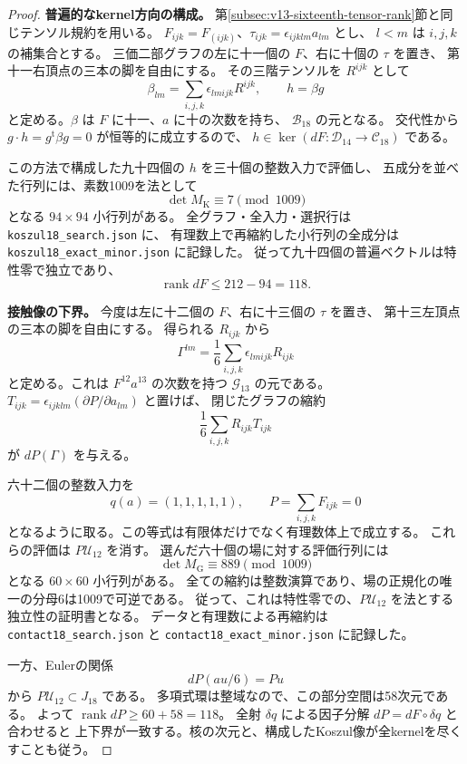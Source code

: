 \documentclass[a4paper,11pt]{ltjsarticle}
\theoremstyle{definition}
\begin{document}
\begin{proof}
\textbf{普遍的なkernel方向の構成。}
第\ref{subsec:v13-sixteenth-tensor-rank}節と同じテンソル規約を用いる。
$F_{ijk}=F_{(ijk)}$、$\tau_{ijk}=\epsilon_{ijklm}a_{lm}$ とし、
$l<m$ は $i,j,k$ の補集合とする。
三価二部グラフの左に十一個の $F$、右に十個の $\tau$ を置き、
第十一右頂点の三本の脚を自由にする。
その三階テンソルを $R^{ijk}$ として
\[
 \beta_{lm}=\sum_{i,j,k}\epsilon_{lmijk}R^{ijk},\qquad h=\beta g
\]
と定める。$\beta$ は $F$ に十一、$a$ に十の次数を持ち、
$\mathcal B_{18}$ の元となる。
交代性から $g\cdot h=g^{\mathrm t}\beta g=0$ が恒等的に成立するので、
$h\in\ker(dF:\mathcal D_{14}\to\mathcal C_{18})$ である。

この方法で構成した九十四個の $h$ を三十個の整数入力で評価し、
五成分を並べた行列には、素数1009を法として
\[
                 \det M_{\mathrm K}\equiv7\pmod{1009}
\]
となる $94\times94$ 小行列がある。
全グラフ・全入力・選択行は
\texttt{koszul18\_search.json} に、
有理数上で再縮約した小行列の全成分は
\texttt{koszul18\_exact\_minor.json} に記録した。
従って九十四個の普遍ベクトルは特性零で独立であり、
\[
                         \operatorname{rank}dF\le212-94=118.
\]

\textbf{接触像の下界。}
今度は左に十二個の $F$、右に十三個の $\tau$ を置き、
第十三左頂点の三本の脚を自由にする。
得られる $R_{ijk}$ から
\[
              \Gamma^{lm}=\frac16\sum_{i,j,k}\epsilon_{lmijk}R_{ijk}
\]
と定める。これは $F^{12}a^{13}$ の次数を持つ
$\mathcal G_{13}$ の元である。
$T_{ijk}=\epsilon_{ijklm}(\partial P/\partial a_{lm})$ と置けば、
閉じたグラフの縮約
\[
                         \frac16\sum_{i,j,k}R_{ijk}T_{ijk}
\]
が $dP(\Gamma)$ を与える。

六十二個の整数入力を
\[
 q(a)=(1,1,1,1,1),\qquad
 P=\sum_{i,j,k}F_{ijk}=0
\]
となるように取る。この等式は有限体だけでなく有理数体上で成立する。
これらの評価は $P\mathcal U_{12}$ を消す。
選んだ六十個の場に対する評価行列には
\[
                    \det M_{\mathrm G}\equiv889\pmod{1009}
\]
となる $60\times60$ 小行列がある。
全ての縮約は整数演算であり、場の正規化の唯一の分母6は1009で可逆である。
従って、これは特性零での、$P\mathcal U_{12}$ を法とする独立性の証明書となる。
データと有理数による再縮約は
\texttt{contact18\_search.json} と
\texttt{contact18\_exact\_minor.json} に記録した。

一方、Eulerの関係
\[
                         dP(au/6)=Pu
\]
から $P\mathcal U_{12}\subset J_{18}$ である。
多項式環は整域なので、この部分空間は58次元である。
よって $\operatorname{rank}dP\ge60+58=118$。
全射 $\delta q$ による因子分解 $dP=dF\circ\delta q$ と合わせると
上下界が一致する。核の次元と、構成したKoszul像が全kernelを尽くすことも従う。
\end{proof}
\end{document}
